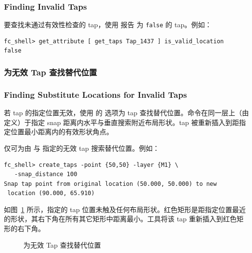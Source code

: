 \subsubsection*{Finding Invalid Taps}

要查找未通过有效性检查的 tap，使用  报告  为 \texttt{false} 的 tap。例如：
\begin{lstlisting}
fc_shell> get_attribute [ get_taps Tap_1437 ] is_valid_location
false
\end{lstlisting}

\subsubsection{为无效 Tap 查找替代位置}
\subsubsection*{Finding Substitute Locations for Invalid Taps}

若 tap 的指定位置无效，使用  的  选项为 tap 查找替代位置。命令在同一层上（由  定义）于指定 snap 距离内水平与垂直搜索附近布局形状。tap 被重新插入到距指定位置最小距离内的有效形状角点。

\begin{noteBox}
仅可为由  与  指定的无效 tap 搜索替代位置。例如：
\begin{lstlisting}
fc_shell> create_taps -point {50,50} -layer {M1} \
   -snap_distance 100
Snap tap point from original location (50.000, 50.000) to new
 location (90.000, 65.910)
\end{lstlisting}
\end{noteBox}

如图~\ref{fig:tap-snap} 所示，指定的 tap 位置未触及任何布局形状。红色矩形是距指定位置最近的形状，其右下角在所有其它矩形中距离最小。工具将该 tap 重新插入到红色矩形的右下角。

\begin{figure}[htbp]
\centering
{}
\caption{为无效 Tap 查找替代位置}
\label{fig:tap-snap}
\end{figure}

